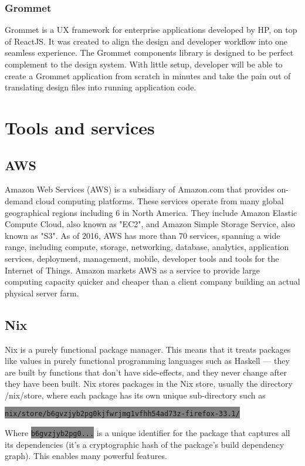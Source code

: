 \subsubsection{Grommet}
Grommet is a UX framework for enterprise applications developed by HP, on top of
ReactJS. It was created to align the design and developer workflow into one
seamless experience. The Grommet components library is designed to be perfect
complement to the design system. With little setup, developer will be able to
create a Grommet application from scratch in minutes and take the pain out of
translating design files into running application code.

\section{Tools and services}
\subsection{AWS}
Amazon Web Services (AWS) is a subsidiary of Amazon.com that provides on-demand
cloud computing platforms. These services operate from many global geographical
regions including 6 in North America. They include Amazon Elastic Compute
Cloud, also known as "EC2", and Amazon Simple Storage Service, also known as
"S3". As of 2016, AWS has more than 70 services, spanning a wide range,
including compute, storage, networking, database, analytics, application
services, deployment, management, mobile, developer tools and tools for the
Internet of Things. Amazon markets AWS as a service to provide large computing
capacity quicker and cheaper than a client company building an actual physical
server farm.

\subsection{Nix}

Nix is a purely functional package manager. This means that it treats packages
like values in purely functional programming languages such as Haskell — they
are built by functions that don’t have side-effects, and they never change after
they have been built. Nix stores packages in the Nix store, usually the
directory /nix/store, where each package has its own unique sub-directory such as

\colorbox{Gray}{\lstinline{nix/store/b6gvzjyb2pg0kjfwrjmg1vfhh54ad73z-firefox-33.1/}}

Where \colorbox{Gray}{\lstinline{b6gvzjyb2pg0...}} is a unique identifier for the package that captures all its
dependencies (it’s a cryptographic hash of the package’s build dependency
graph). This enables many powerful features.

